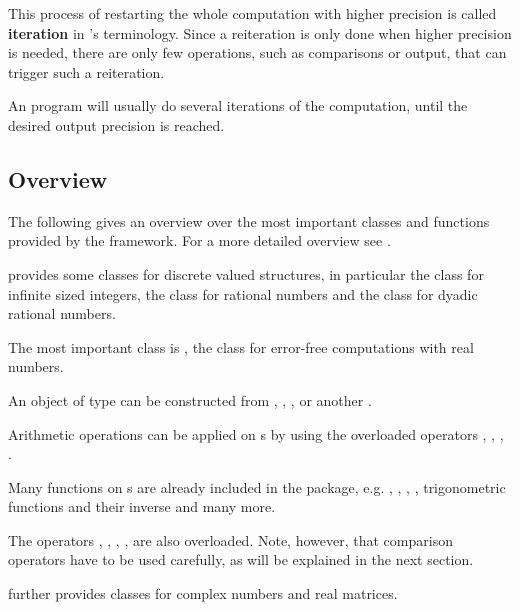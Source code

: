  		This process of restarting the whole computation with higher precision is called
    \textbf{iteration} in {\irram}'s terminology.
    Since a reiteration is only done when higher precision is needed, there
    are only few operations, such as comparisons or output, that can trigger such a reiteration.

    An \irram program will usually do several iterations of the computation,
    until the desired output precision is reached.
    
	\subsection{Overview}
	  The following gives an overview over the most important classes and
    functions provided by the \irram framework. For a more detailed overview
    see \cite{irram}.
		
    \irram provides some classes for discrete valued structures, in particular
    the class  for infinite sized integers, the class
     for rational numbers and the class  for dyadic
    rational numbers. 

    The most important class is \real, the class for error-free computations
    with real numbers. 

		An object of type \real can be constructed from , , ,  
		or another \real. 

		Arithmetic operations can be applied on {\real}s by using the overloaded operators \code{+}, \code{-}, \code{*},
		\code{/}.

		Many functions on {\real}s are already included in the \irram package, e.g. 
		, , , ,
		trigonometric functions and their inverse and many more.

		The operators \code{<}, \code{<=}, \code{==}, \code{>=}, \code{>} are also
    overloaded.
    Note, however, that comparison operators have to be used carefully, as will be explained in the
    next section.
    
   \irram further provides classes for complex numbers and real matrices.


